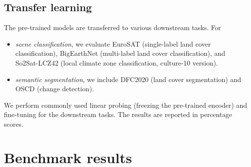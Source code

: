 \documentclass[lettersize,journal]{IEEEtran}
\begin{document}
\subsection{Transfer learning} The pre-trained models are transferred to various downstream tasks. For
\begin{itemize}
    \item \textit{scene classification}, we evaluate EuroSAT \citep{helber2019eurosat} (single-label land cover classification), BigEarthNet \citep{sumbul2019bigearthnet} (multi-label land cover classification), and So2Sat-LCZ42 \citep{zhu2020so2sat} (local climate zone classification, culture-10 version).
    \item \textit{semantic segmentation}, we include DFC2020 \citep{rha7-m332-19} (land cover segmentation) and OSCD \citep{daudt2018urban} (change detection).
\end{itemize}
We perform commonly used linear probing (freezing the pre-trained encoder) and fine-tuning for the downstream tasks. The results are reported in percentage scores.



\section{Benchmark results}
\label{sec:benchmark}
\end{document}

